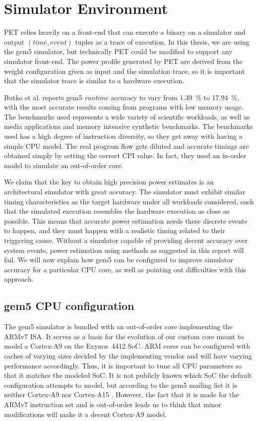 \section{Simulator Environment}

PET relies heavily on a front-end that can execute a binary on a simulator and
output $(time, event)$ tuples as a trace of execution. In this thesis, we are
using the gem5 simulator, but technically PET could be modified to support any
simulator front-end. The power profile generated by PET are derived from the
weight configuration given as input and the simulation trace, so it is important
that the simulator trace is similar to a hardware execution.

Butko et al. \cite{butko2012accuracy} reports gem5 \emph{runtime} accuracy to
vary from 1.39~\% to 17.94~\%, with the most accurate results coming from
programs with low memory usage. The benchmarks used represents a wide variety of
scientific workloads, as well as media applications and memory intensive
synthetic benchmarks. The benchmarks used has a high degree of instruction
diversity, so they get away with having a simple CPU model. The real program
flow gets diluted and accurate timings are obtained simply by setting the
correct CPI value. In fact, they used an in-order model to simulate an
out-of-order core.

We claim that the key to obtain high precision power estimates is an
architectural simulator with great accuracy. The simulator must exhibit similar
timing characteristics as the target hardware under all workloads considered,
such that the simulated execution resembles the hardware execution as close as
possible. This means that accurate power estimation needs these discrete events
to happen, and they must happen with a realistic timing related to their
triggering cause. Without a simulator capable of providing decent accuracy over
system events, power estimation using methods as suggested in this report will
fail. We will now explain how gem5 can be configured to improve simulator
accuracy for a particular CPU core, as well as pointing out difficulties with
this approach.


\subsection{gem5 CPU configuration}
The gem5 simulator is bundled with an out-of-order core implementing the ARMv7
ISA. It serves as a basis for the evolution of our custom core meant to model a
Cortex-A9 on the Exynos~4412 SoC. ARM cores can be configured with caches of
varying sizes decided by the implementing vendor and will have varying
performance accordingly. Thus, it is important to tune all CPU parameters so
that it matches the modeled SoC. It is not publicly known which SoC the default
configuration attempts to model, but according to the gem5 mailing list it is
neither Cortex-A9 nor Cortex-A15 \cite{a15maillist}. However, the fact that it
is made for the ARMv7 instruction set and is out-of-order leads us to think that
minor modifications will make it a decent Cortex-A9 model.

